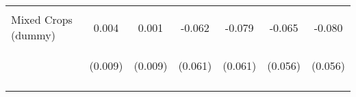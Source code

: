 \begin{center}
\begin{tabular}{lcccccc}
\vspace{4pt} & \begin{footnotesize}[0.029]\end{footnotesize} & \begin{footnotesize}[0.043]\end{footnotesize} & \begin{footnotesize}[0.044]\end{footnotesize} & \begin{footnotesize}[0.076]\end{footnotesize} & \begin{footnotesize}[0.041]\end{footnotesize} & \begin{footnotesize}[0.072]\end{footnotesize} \\
Mixed Crops (dummy) & 0.004 & 0.001 & -0.062 & -0.079 & -0.065 & -0.080 \\
 & \begin{footnotesize}(0.009)\end{footnotesize} & \begin{footnotesize}(0.009)\end{footnotesize} & \begin{footnotesize}(0.061)\end{footnotesize} & \begin{footnotesize}(0.061)\end{footnotesize} & \begin{footnotesize}(0.056)\end{footnotesize} & \begin{footnotesize}(0.056)\end{footnotesize} \\
\vspace{4pt} & \begin{footnotesize}[0.673]\end{footnotesize} & \begin{footnotesize}[0.932]\end{footnotesize} & \begin{footnotesize}[0.304]\end{footnotesize} & \begin{footnotesize}[0.190]\end{footnotesize} & \begin{footnotesize}[0.243]\end{footnotesize} & \begin{footnotesize}[0.149]\end{footnotesize} \\

\end{tabular}
\end{center}
